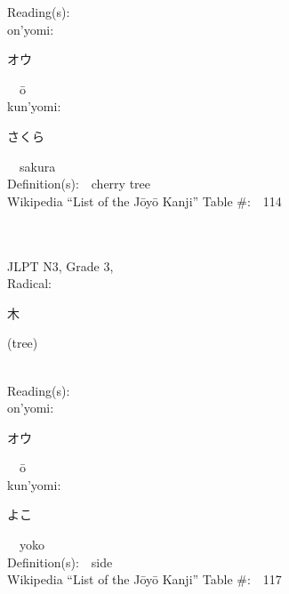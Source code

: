 \begin{multicols}{2}
Reading(s):\ \ \\
{\hspace*{1em}}on'yomi:\ \ \\
{\hspace*{2em}}{\begin{CJK}{UTF8}{min} オウ \end{CJK}}\ \ \=o\ \ \\
{\hspace*{1em}}kun'yomi:\ \ \\
{\hspace*{2em}}{\begin{CJK}{UTF8}{min} さくら \end{CJK}}\ \ sakura\ \ \\
Definition(s):\ \ cherry tree \\
Wikipedia ``List of the J\=oy\=o Kanji'' Table \#:\ \ 114 \\
\ \ \\
{\fontsize{34pt}{40pt}  }\ \ \\  %
{JLPT N3, Grade 3, \\Radical:\ \ {\begin{CJK}{UTF8}{min} 木 \end{CJK}} (tree) } \\
Reading(s):\ \ \\
{\hspace*{1em}}on'yomi:\ \ \\
{\hspace*{2em}}{\begin{CJK}{UTF8}{min} オウ \end{CJK}}\ \ \=o\ \ \\
{\hspace*{1em}}kun'yomi:\ \ \\
{\hspace*{2em}}{\begin{CJK}{UTF8}{min} よこ \end{CJK}}\ \ yoko\ \ \\
Definition(s):\ \ side \\
Wikipedia ``List of the J\=oy\=o Kanji'' Table \#:\ \ 117 \\
\ \ \\
{\fontsize{34pt}{40pt}  }\ \ \\  %

\end{multicols}
